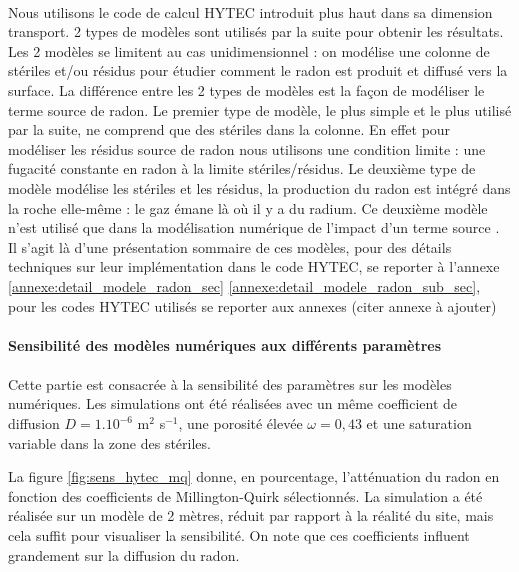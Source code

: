 \documentclass{article}
\begin{document}
\paragraph{} Nous utilisons le code de calcul HYTEC introduit plus haut dans sa dimension transport. 2 types de modèles sont utilisés par la suite pour obtenir les résultats. Les 2 modèles se limitent au cas unidimensionnel : on modélise une colonne de stériles et/ou résidus pour étudier comment le radon est produit et diffusé vers la surface. La différence entre les 2 types de modèles est la façon de modéliser le terme source de radon. Le premier type de modèle, le plus simple et le plus utilisé par la suite, ne comprend que des stériles dans la colonne. En effet pour modéliser les résidus source de radon nous utilisons une condition limite : une fugacité constante en radon à la limite stériles/résidus. Le deuxième type de modèle modélise les stériles et les résidus, la production du radon est intégré dans la roche elle-même : le gaz émane là où il y a du radium. Ce deuxième modèle n'est utilisé que dans la modélisation numérique de l'impact d'un terme source . Il s’agit là d’une présentation sommaire de ces modèles, pour des détails techniques sur leur implémentation dans le code HYTEC, se reporter à l'annexe \ref{annexe:detail_modele_radon_sec} \ref{annexe:detail_modele_radon_sub_sec}, pour les codes HYTEC utilisés se reporter aux annexes (citer annexe à ajouter)

\paragraph{Sensibilité des modèles numériques aux différents paramètres}
\paragraph{} Cette partie est consacrée à la sensibilité des paramètres sur les modèles numériques. Les simulations ont été réalisées avec un même coefficient de diffusion $D = 1.10^{-6}$ m$^2 \!$ s$^{-1}$, une porosité élevée $\omega = 0,43$ et une saturation variable dans la zone des stériles.

La figure \ref{fig:sens_hytec_mq} donne, en pourcentage, l'atténuation du radon en fonction des coefficients de Millington-Quirk sélectionnés. La simulation a été réalisée sur un modèle de 2 mètres, réduit par rapport à la réalité du site, mais cela suffit pour visualiser la sensibilité. On note que ces coefficients influent grandement sur la diffusion du radon.
\end{document}
